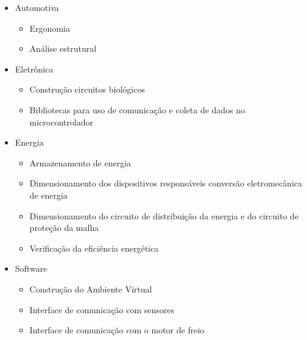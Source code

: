 \begin{itemize}
	\item Automotiva
		\begin{itemize}
		\item Ergonomia
		\item Análise estrutural
		\end{itemize}
	\item Eletrônica
		\begin{itemize}
		\item Construção circuitos biológicos
		\item Bibliotecas para uso de comunicação e coleta de dados no microcontrolador
		\end{itemize}
	\item Energia
		\begin{itemize}
		\item Armazenamento de energia
		\item Dimensionamento dos dispositivos responsáveis conversão eletromecânica de energia
		\item Dimensionamento do circuito de distribuição da energia e do circuito de proteção da malha
		\item Verificação da eficiência energética
		\end{itemize}
	\item Software
		\begin{itemize}
		\item Construção do Ambiente Virtual
		\item Interface de comunicação com sensores
		\item Interface de comunicação com o motor de freio
		\end{itemize}
\end{itemize}
